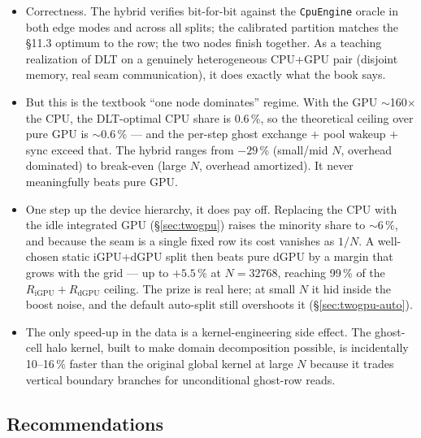 \documentclass[
	english,
	letterpaper, oneside
]{article}
\begin{document}
\begin{itemize}
	\item Correctness. The hybrid verifies bit-for-bit against the \texttt{CpuEngine}
	oracle in both edge modes and across all splits; the calibrated partition matches
	the \S11.3 optimum to the row; the two nodes finish together. As a teaching
	realization of DLT on a genuinely heterogeneous CPU+GPU pair (disjoint memory,
	real seam communication), it does exactly what the book says.
	\item But this is the textbook ``one node dominates'' regime. With the GPU
	$\sim$160$\times$ the CPU, the DLT-optimal CPU share is 0.6\,\%, so the
	theoretical ceiling over pure GPU is $\sim$0.6\,\% --- and the per-step ghost
	exchange $+$ pool wakeup $+$ sync exceed that. The hybrid ranges from $-29$\,\%
	(small/mid $N$, overhead dominated) to break-even (large $N$, overhead
	amortized). It never meaningfully beats pure GPU.
	\item One step up the device hierarchy, it does pay off. Replacing the CPU with the
	idle integrated GPU (\S\ref{sec:twogpu}) raises the minority share to $\sim$6\,\%,
	and because the seam is a single fixed row its cost vanishes as $1/N$. A well-chosen
	static iGPU+dGPU split then beats pure dGPU by a margin that grows with the grid ---
	up to $+5.5\,\%$ at $N=32768$, reaching 99\,\% of the $R_\text{iGPU}+R_\text{dGPU}$
	ceiling. The prize is real here; at small $N$ it hid inside the boost noise, and the
	default auto-split still overshoots it (\S\ref{sec:twogpu-auto}).
	\item The only speed-up in the data is a kernel-engineering side effect. The
	ghost-cell halo kernel, built to make domain decomposition possible, is
	incidentally 10--16\,\% faster than the original global kernel at large $N$
	because it trades vertical boundary branches for unconditional ghost-row reads.
\end{itemize}

\subsection*{Recommendations}
\end{document}
